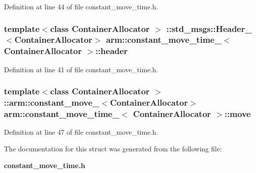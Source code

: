 \-Definition at line 44 of file constant\-\_\-move\-\_\-time.\-h.

\subsubsection[{header}]{\setlength{\rightskip}{0pt plus 5cm}template$<$class Container\-Allocator $>$ \-::std\-\_\-msgs\-::\-Header\-\_\-$<$\-Container\-Allocator$>$ {\bf arm\-::constant\-\_\-move\-\_\-time\-\_\-}$<$ \-Container\-Allocator $>$\-::{\bf header}}\label{structarm_1_1constant__move__time___af31a3d43d8d30040e863265d3d297ceb}


\-Definition at line 41 of file constant\-\_\-move\-\_\-time.\-h.

\subsubsection[{move}]{\setlength{\rightskip}{0pt plus 5cm}template$<$class Container\-Allocator $>$ \-::{\bf arm\-::constant\-\_\-move\-\_\-}$<$\-Container\-Allocator$>$ {\bf arm\-::constant\-\_\-move\-\_\-time\-\_\-}$<$ \-Container\-Allocator $>$\-::{\bf move}}\label{structarm_1_1constant__move__time___ae89f899901c0274b1365266aa11363db}


\-Definition at line 47 of file constant\-\_\-move\-\_\-time.\-h.



\-The documentation for this struct was generated from the following file\-:\begin{DoxyCompactItemize}
\item 
{\bf constant\-\_\-move\-\_\-time.\-h}\end{DoxyCompactItemize}
